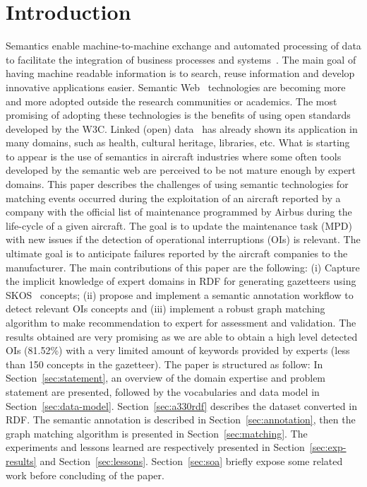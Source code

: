 \documentclass[runningheads,a4paper]{{llncs}}
\begin{document}

\section{Introduction}
\label{sec:introduction}
Semantics enable machine-to-machine exchange and automated processing of data to facilitate the integration of business processes and systems~\cite{cardoso2007}. The main goal of having machine readable information is to search, reuse information and develop innovative applications easier. 
Semantic Web~\cite{berners2001} technologies are becoming more and more adopted outside the research communities or academics. The most promising of adopting these technologies is the benefits of using open standards developed by the W3C. Linked (open) data~\cite{bizer2009} has already shown its application in many domains, such as health, cultural heritage, libraries, etc. What is starting to appear is the use of semantics in aircraft industries where some often tools developed by the semantic web are perceived to be not mature enough by expert domains. This paper describes the challenges of using semantic technologies for matching events occurred during the exploitation of an aircraft reported by a company with the official list of maintenance programmed by Airbus during the life-cycle of a given aircraft. The goal is to update the maintenance task (MPD) with new issues if the detection of operational interruptions (OIs) is relevant. The ultimate goal is to anticipate failures reported by the aircraft companies to the manufacturer. The main contributions of this paper are the following: (i) Capture the implicit knowledge of expert domains in RDF for generating gazetteers using SKOS~\cite{skosw3c} concepts;  (ii) propose and implement a semantic annotation workflow to detect relevant OIs concepts and (iii) implement a robust graph matching algorithm to make recommendation to expert for assessment and validation. The results obtained are very promising as we are able to obtain a high level detected OIs (81.52\%) with a very limited amount of keywords provided by experts (less than 150 concepts in the gazetteer). The paper is structured as follow: In Section~\ref{sec:statement}, an overview of the domain expertise and problem statement are presented, followed by the vocabularies and data model in Section~\ref{sec:data-model}. Section~\ref{sec:a330rdf} describes the dataset converted in RDF. The semantic annotation is described in Section~\ref{sec:annotation}, then the graph matching algorithm is presented in Section~\ref{sec:matching}. The experiments and lessons learned are respectively presented in Section~\ref{sec:exp-results} and Section~\ref{sec:lessons}. Section~\ref{sec:soa} briefly expose some related work before concluding of the paper.    
\end{document}
